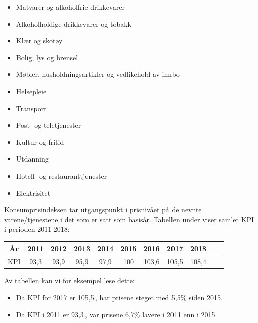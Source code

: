 \parbox[t]{0.49\linewidth}{\begin{itemize}
		\item Matvarer og alkoholfrie drikkevarer
		\item Alkoholholdige drikkevarer og tobakk
		\item Klær og skotøy
		\item Bolig, lys og brensel
		\item Møbler, husholdningsartikler og vedlikehold av innbo
		\item Helsepleie
\end{itemize}}
\parbox[t]{0.49\linewidth}{\begin{itemize}
		\item Transport
		\item Post- og teletjenester
		\item Kultur og fritid
		\item Utdanning
		\item Hotell- og restauranttjenester
		\item Elektrisitet
\end{itemize}}
Konsumprisindeksen tar utgangspunkt i prisnivået på de nevnte varene/tjenestene i det som er satt som basisår. Tabellen under viser samlet KPI i perioden 2011-2018:
\begin{center}
	\begin{tabular}{c|c|c|c|c|c|c|c|c|c|c}
		År  & 2011 & 2012 & 2013 & 2014 & 2015 & 2016 & 2017 & 2018  \\
		\hline
		KPI & 93,3  & 93,9  & 95,9  & 97,9  & 100   & 103,6 & 105,5 & 108,4 
	\end{tabular}
\end{center}
Av tabellen kan vi for eksempel lese dette:
\begin{itemize}
	\item Da KPI for 2017 er 105,5\,, har prisene steget med 5,5\% siden 2015.
	\item Da KPI i 2011 er 93,3\,, var prisene 6,7\% lavere i 2011 enn i 2015.
\end{itemize}

\newpage
{}
